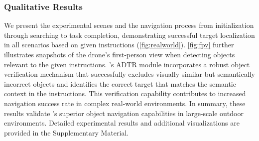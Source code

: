 \subsubsection{Qualitative Results}
We present the experimental scenes and the navigation process from initialization through searching to task completion, demonstrating successful target localization in all scenarios based on given instructions (\fig\ref{fig:realworld}). \fig\ref{fig:fpv} further illustrates snapshots of the drone's first-person view when detecting objects relevant to the given instructions. \sysname's ADTR module incorporates a robust object verification mechanism that successfully excludes visually similar but semantically incorrect objects and identifies the correct target that matches the semantic context in the instructions. This verification capability contributes to increased navigation success rate in complex real-world environments. In summary, these results validate \sysname's superior object navigation capabilities in large-scale outdoor environments. Detailed experimental results and additional visualizations are provided in the Supplementary Material.









